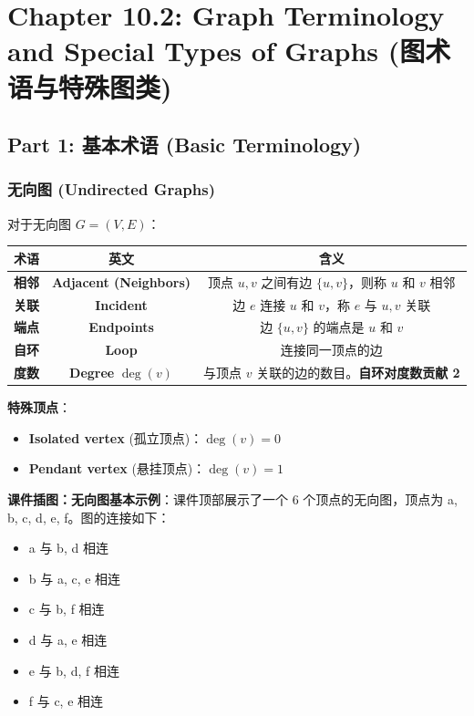 \documentclass[10pt,a4paper,openany]{ctexbook}
\theoremstyle{definition}
\theoremstyle{remark}
\begin{document}
\newpage

\section{Chapter 10.2: Graph Terminology and Special Types of Graphs (图术语与特殊图类)}

\vspace{-2pt}

\subsection{Part 1: 基本术语 (Basic Terminology)}

\subsubsection{无向图 (Undirected Graphs)}

对于无向图 $G = (V, E)$：
\begin{center}
\begin{tabular}{ccc}
\hline
术语 & 英文 & 含义 \\ \hline
\textbf{相邻} & \textbf{Adjacent (Neighbors)} & 顶点 $u, v$ 之间有边 $\{u,v\}$，则称 $u$ 和 $v$ 相邻 \\
\textbf{关联} & \textbf{Incident} & 边 $e$ 连接 $u$ 和 $v$，称 $e$ 与 $u, v$ 关联 \\
\textbf{端点} & \textbf{Endpoints} & 边 $\{u,v\}$ 的端点是 $u$ 和 $v$ \\
\textbf{自环} & \textbf{Loop} & 连接同一顶点的边 \\
\textbf{度数} & \textbf{Degree} $\deg(v)$ & 与顶点 $v$ 关联的边的数目。\textbf{自环对度数贡献 2} \\
\hline
\end{tabular}

\end{center}

\textbf{特殊顶点}：
\begin{itemize}
\item \textbf{Isolated vertex} (孤立顶点)：$\deg(v) = 0$
\item \textbf{Pendant vertex} (悬挂顶点)：$\deg(v) = 1$

\end{itemize}

\textbf{课件插图：无向图基本示例}：课件顶部展示了一个 6 个顶点的无向图，顶点为 a, b, c, d, e, f。图的连接如下：
\begin{itemize}
\item a 与 b, d 相连
\item b 与 a, c, e 相连
\item c 与 b, f 相连
\item d 与 a, e 相连
\item e 与 b, d, f 相连
\item f 与 c, e 相连

\end{itemize}
\end{document}
